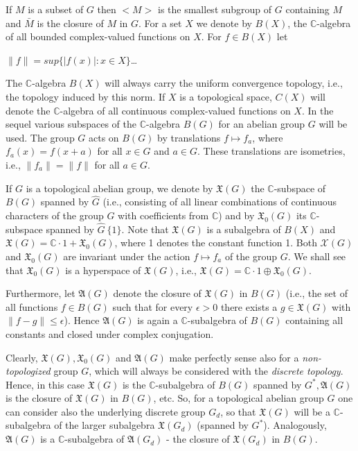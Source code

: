 \documentclass[12pt]{article}
\begin{document}
    
    If $M$ is a subset of $G$ then $<M>$ is the smallest subgroup of $G$ containing $M$ and $\bar{M}$ is the closure of $M$ in $G$.
    For a set $X$ we denote by $B(X)$, the $\mathbb{C}$-algebra of all bounded complex-valued functions on $X$. For $f \in B(X)$ let


    $\|f\| = sup\{|f(x)|: x \in X\}$\dots


        The $\mathbb{C}$-algebra $B(X)$ will always carry the uniform convergence topology, i.e., the topology induced by this norm. If $X$ is a
    topological space, $C(X)$ will denote the $\mathbb{C}$-algebra of all continuous complex-valued functions on $X$.
    In the sequel various subspaces of the $\mathbb{C}$-algebra $B(G)$ for an abelian group $G$ will be used. The group $G$ acts on $B(G)$
    by translations $f \mapsto f_a$, where $f_a (x) = f (x + a)$ for all $x \in G$ and $a \in G$. These translations are isometries, i.e., $\| f_a \|=\| f \|$ for
    all $a \in G$.


        If $G$ is a topological abelian group, we denote by $\mathfrak{X} (G)$ the $\mathbb{C}$-subspace of $B(G)$ spanned by $\widehat{G}$ (i.e., consisting of all linear
    combinations of continuous characters of the group $G$ with coefficients from $\mathbb{C}$) and by $\mathfrak{X}_0(G)$ its $\mathbb{C}$-subspace spanned by
    $\widehat{G} \ \{1\}$. Note that $\mathfrak{X}(G)$ is a subalgebra of $B(X)$ and $\mathfrak{X}(G) = \mathbb{C} \cdot 1 + \mathfrak{X}_0(G)$, where 1 denotes the constant function 1. Both
    $\mathcal{X} (G)$ and $\mathfrak{X}_0(G)$ are invariant under the action $f \mapsto f_a$ of the group $G$. We shall see that $\mathfrak{X}_0(G)$ is a hyperspace of $\mathfrak{X}(G)$,
    i.e., $\mathfrak{X}(G) = \mathbb{C} \cdot 1 \oplus \mathfrak{X}_0(G)$.
        
    
        Furthermore, let $\mathfrak{A}(G)$ denote the closure of $\mathfrak{X}(G)$ in $B(G)$ (i.e., the set of all functions $f \in B(G)$ such that for every $\epsilon > 0$
    there exists a $g \in \mathfrak{X}(G)$ with $\| f - g \| \leqslant \epsilon$). Hence $\mathfrak{A}(G)$ is again a $\mathbb{C}$-subalgebra of $B(G)$ containing all constants and closed
    under complex conjugation.
    
    
        Clearly, $\mathfrak{X}(G), \mathfrak{X}_0(G)$ and $\mathfrak{A}(G)$ make perfectly sense also for a \emph{non-topologized} group $G$, which will always be considered
    with the \emph{discrete topology}. Hence, in this case $\mathfrak{X}(G)$ is the $\mathbb{C}$-subalgebra of $B(G)$ spanned by $G^*, \mathfrak{A}(G)$ is the closure of $\mathfrak{X}(G)$
    in $B(G)$, etc. So, for a topological abelian group $G$ one can consider also the underlying discrete group $G_d$, so that $\mathfrak{X}(G)$ will
    be a $\mathbb{C}$-subalgebra of the larger subalgebra $\mathfrak{X}(G_d)$ (spanned by $G^*$). Analogously, $\mathfrak{A}(G)$ is a $\mathbb{C}$-subalgebra of $\mathfrak{A}(G_d)$ - the
    closure of $\mathfrak{X}(G_d)$ in $B(G)$.
\end{document}
